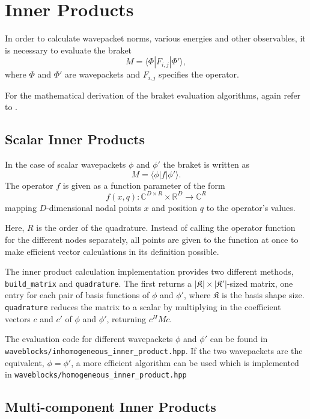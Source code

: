 \section{Inner Products}

In order to calculate wavepacket norms, various energies and other observables,
it is necessary to evaluate the braket
\begin{equation}
  \label{eq:braket}
  M = \langle \Phi | F_{i,j} | \Phi' \rangle,
\end{equation}
where $\Phi$ and $\Phi'$ are wavepackets and $F_{i,j}$ specifies the operator.

For the mathematical derivation of the braket evaluation algorithms, again refer
to \cite{B_master_thesis}.

\subsection{Scalar Inner Products}

In the case of scalar wavepackets $\phi$ and $\phi'$ the braket is written as
\begin{equation}
  M = \langle \phi | f | \phi' \rangle.
\end{equation}
The operator $f$ is given as a function parameter of the form
\begin{equation}
  f(x, q) : \mathbb{C}^{D \times R} \times \mathbb{R}^D \rightarrow \mathbb{C}^R
\end{equation}
mapping $D$-dimensional nodal points $x$ and position
$q$ to the operator's values.

Here, $R$ is the order of the quadrature.
Instead of calling the operator function for the different nodes separately, all
points are given to the function at once to make efficient vector calculations
in its definition possible.

The inner product calculation implementation provides two different methods,
\texttt{build\_matrix} and \texttt{quadrature}.
The first returns a $|\mathfrak{K}| \times |\mathfrak{K'}|$-sized matrix, one
entry for each pair of basis functions of $\phi$ and $\phi'$, where
$\mathfrak{K}$ is the basis shape size.
\texttt{quadrature} reduces the matrix to a scalar by multiplying in the
coefficient vectors $c$ and $c'$ of $\phi$ and $\phi'$, returning $c^H M c$.

The evaluation code for different wavepackets $\phi$ and $\phi'$ can be found in
\texttt{waveblocks/inhomogeneous\_inner\_product.hpp}.
If the two wavepackets are the equivalent, $\phi = \phi'$, a more efficient
algorithm can be used which is implemented in
\texttt{waveblocks/homogeneous\_inner\_product.hpp}

\subsection{Multi-component Inner Products}
